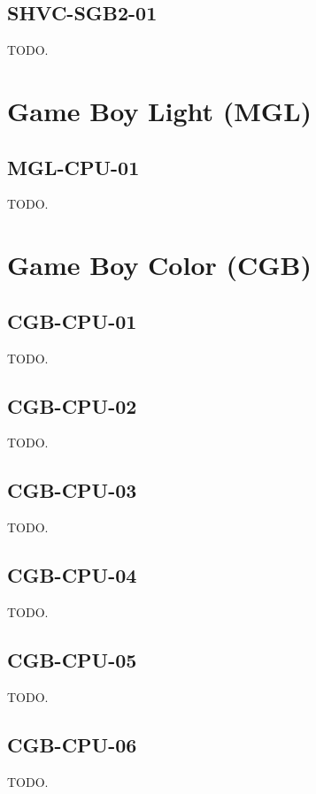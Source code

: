 \subsection{SHVC-SGB2-01}

TODO.

\section{Game Boy Light (MGL)}

\subsection{MGL-CPU-01}

TODO.

\section{Game Boy Color (CGB)}

\subsection{CGB-CPU-01}

TODO.

\subsection{CGB-CPU-02}

TODO.

\subsection{CGB-CPU-03}

TODO.

\subsection{CGB-CPU-04}

TODO.

\subsection{CGB-CPU-05}

TODO.

\subsection{CGB-CPU-06}

TODO.

